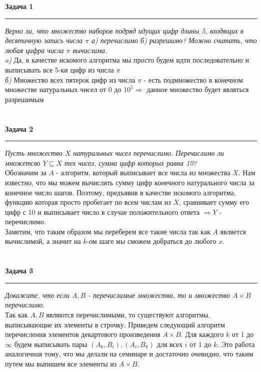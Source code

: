 \documentclass[a4paper,11pt]{article}
\begin{document}
\textbf{\large Задача 1}
\medskip\hrule\medskip
\textit{Верно ли, что множество наборов подряд идущих цифр длины 5, входящих  в десятичную запись числа $ \pi $ а) перечислимо  б) разрешимо? Можно считать, что любая цифра числа $ \pi $ вычислима.}  \\ 

\textsl{a)} Да, в качестве искомого алгоритма мы просто будем идти последовательно и выписывать все 5-ки цифр из числа $ \pi $ \\ 

\textsl{б)} Множество всех пятерок цифр из числа $ \pi $ - есть подмножество в конечном множестве натуральных чисел от 0 до $ 10^5 \Rightarrow $ данное множество будет являться разрешимым
\\ \\ \\


\textbf{\large Задача 2}
\medskip\hrule\medskip
\textit{Пусть множество $ X $ натуральных чисел перечислимо. Перечислимо ли множетсво $ Y \subseteq X $ тех чисел, сумма цифр которых равна 10?}  \\  

Обозначим за $ A $ - алгоритм, который выписывает все числа из множества $ X $. Нам известно, что мы можем вычислять сумму цифр конечного натурального числа за конечное число шагов. Поэтому, предъявив в качестве искомого алгоритма, функцию которая просто пробегает по всем числам из $ X $, сравнивает сумму его цифр с 10 и выписывает число в случае положительного ответа $ \Rightarrow Y  $ - перечислимо. \\
Заметим, что таким образом мы переберем все такие числа так как $ A $  является вычислимой, а значит на $ k $-ом шаге мы сможем добраться до любого $ x $. 
\\ \\ \\


\textbf{\large Задача 3}
\medskip\hrule\medskip
\textit{Докажите, что если $ A, B $ - перечислимые множества, то и множество $ A\times B $ перечислимо.} \\

Так как $ A, B $ являются перечислимыми, то существуют алгоритмы, выписывающие их элементы в строчку. Приведем следующий  алгоритм перечисления элементов декартового произведения $ A \times B $. Для каждого $ k $ от 1 до $ \infty $ будем выписывать пары $ (A_k, B_i), (A_i, B_k) $ для всех $ i $ от 1 до $ k $. Это работа аналогичная тому, что мы делали на семинаре и достаточно очевидно, что таким путем мы выпишем все элементы из $ A \times B $.
\newpage
\end{document}
